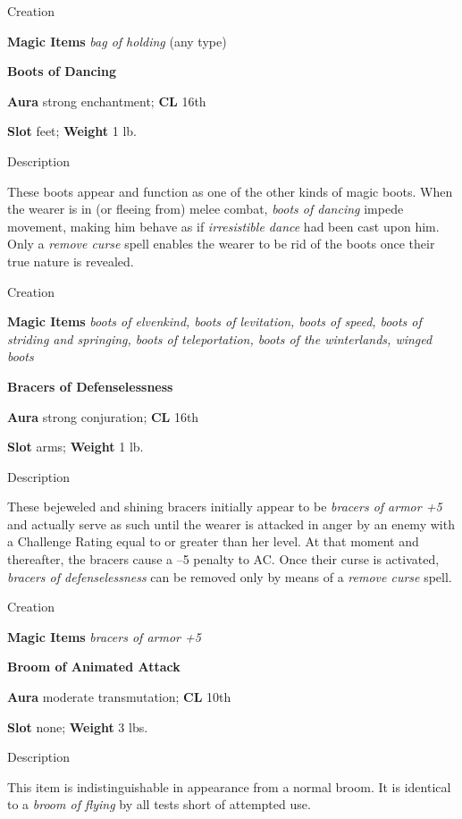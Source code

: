 Creation
				
\textbf{Magic Items}\textit{ bag of holding }(any type)
				
\textbf{Boots of Dancing}
				
\textbf{Aura} strong enchantment; \textbf{CL} 16th
				
\textbf{Slot} feet; \textbf{Weight }1 lb.
				
Description
				
These boots appear and function as one of the other kinds of magic boots. When the wearer is in (or fleeing from) melee combat, \textit{boots of dancing }impede movement, making him behave as if \textit{irresistible dance }had been cast upon him. Only a \textit{remove curse }spell enables the wearer to be rid of the boots once their true nature is revealed. 
				
Creation
				
\textbf{Magic Items}\textit{ boots of elvenkind, boots of levitation, boots of speed, boots of striding and springing, boots of teleportation, boots of the winterlands, winged boots}
				
\textbf{Bracers of Defenselessness}
				
\textbf{Aura} strong conjuration; \textbf{CL} 16th
				
\textbf{Slot} arms; \textbf{Weight }1 lb.
				
Description
				
These bejeweled and shining bracers initially appear to be \textit{bracers of armor +5 }and actually serve as such until the wearer is attacked in anger by an enemy with a Challenge Rating equal to or greater than her level. At that moment and thereafter, the bracers cause a --5 penalty to AC. Once their curse is activated, \textit{bracers of defenselessness }can be removed only by means of a \textit{remove curse }spell. 
				
Creation
				
\textbf{Magic Items}\textit{ bracers of armor +5}
				
\textbf{Broom of Animated Attack}
				
\textbf{Aura} moderate transmutation; \textbf{CL} 10th
				
\textbf{Slot} none; \textbf{Weight }3 lbs.
				
Description
				
This item is indistinguishable in appearance from a normal broom. It is identical to a \textit{broom of flying }by all tests short of attempted use.
				
